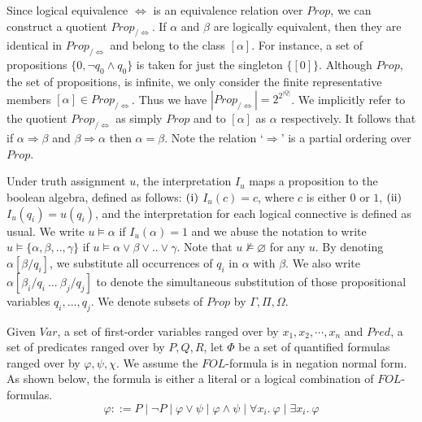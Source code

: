 Since logical equivalence \( \Leftrightarrow \) is an equivalence relation over
\( \mathit{Prop} \), we can construct a quotient \(
\mathit{Prop}_{/\Leftrightarrow} \). If \( \alpha \) and \( \beta \) are
logically equivalent, then they are identical in \(
\mathit{Prop}_{/\Leftrightarrow} \) and belong to the class \( [\alpha] \). For
instance, a set of propositions \( \{ 0, \neg q_0 \wedge q_0 \} \) is taken for
just the singleton \( \{ [0] \} \). Although \( \mathit{Prop} \), the set of
propositions, is infinite, we only consider the finite representative members \(
[\alpha] \in \mathit{Prop}_{/\Leftrightarrow} \). Thus we have \(
|\mathit{Prop}_{/\Leftrightarrow}| = 2^{2^{|Q|}} \). We implicitly refer to the
quotient \( \mathit{Prop}_{/\Leftrightarrow} \) as simply \( \mathit{Prop} \)
and to \( [\alpha] \) as \( \alpha \) respectively.  It follows that if \(
\alpha \Rightarrow \beta \) and \( \beta \Rightarrow \alpha \) then \( \alpha =
\beta \). Note the relation `\( \Rightarrow \)' is a partial ordering over \(
\mathit{Prop} \).

Under truth assignment \( u \), the interpretation \( I_u \) maps a proposition
to the boolean algebra, defined as follows: \( (\rm i) \) \( I_u(c) = c\), where
\( c \) is either \( 0 \) or \( 1 \), \( (\rm ii) \) \( I_u(q_i) = u(q_i) \),
and the interpretation for each logical connective is defined as usual. We write
\( u \models \alpha \) if \( I_u(\alpha) = 1 \) and we abuse the notation to
write \( u \models \{\alpha, \beta, .., \gamma \} \) if \( u \models \alpha \vee
\beta \vee ..\vee \gamma \). Note that \( u \not\models \varnothing \) for any
\( u \). By denoting \( \alpha[\beta/q_i] \), we substitute all occurrences of
\( q_i \) in \( \alpha \) with \( \beta \). We also write \( \alpha[\beta_i/q_i
  \ ...\ \beta_j/q_j] \) to denote the simultaneous substitution of those
propositional variables \( q_i, ..., q_j \). We denote subsets of \(
\mathit{Prop} \) by \( \Gamma, \Pi, \Omega \).

Given \( \mathit{Var} \), a set of first-order variables ranged over by \( x_1,
x_2, \cdots, x_n \) and \( \mathit{Pred} \), a set of predicates ranged over by
\( P, Q, R \), let \( \Phi \) be a set of quantified formulas ranged over by \(
\varphi, \psi, \chi \). We assume the \( \mathit{FOL} \)-formula is in negation
normal form. As shown below, the formula is either a literal or a logical
combination of \( \mathit{FOL} \)-formulas.
\[
  \varphi ::= P \mid \neg P
  \mid \varphi \vee \psi \mid \varphi \wedge \psi
  \mid \forall x_i .\ \varphi \mid \exists x_i .\ \varphi 
\]


